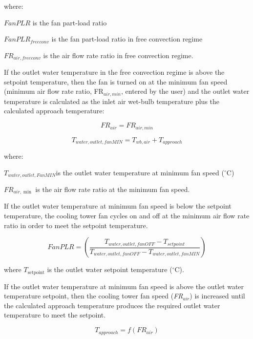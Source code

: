 where:

\(FanPLR\) is the fan part-load ratio

\(FanPL{R_{freeconv}}\) is the fan part-load ratio in free convection regime

\(F{R_{air,freeconv}}\) is the air flow rate ratio in free convection regime.

If the outlet water temperature in the free convection regime is above the setpoint temperature, then the fan is turned on at the minimum fan speed (minimum air flow rate ratio, FR\(_{air,min}\), entered by the user) and the outlet water temperature is calculated as the inlet air wet-bulb temperature plus the calculated approach temperature:

\begin{equation}
FR_{air} = FR_{air,min}
\end{equation}

\begin{equation}
T_{water,outlet,fanMIN} = T_{wb,air} + T_{approach}
\end{equation}

where:

\({T_{water,outlet,FanMIN}}\)is the outlet water temperature at minimum fan speed (\(^{\circ}\)C)

\(F{R_{air,\min }}\) is the air flow rate ratio at the minimum fan speed.

If the outlet water temperature at minimum fan speed is below the setpoint temperature, the cooling tower fan cycles on and off at the minimum air flow rate ratio in order to meet the setpoint temperature.

\begin{equation}
FanPLR = \left( {\frac{{{T_{water,outlet,fanOFF}} - {T_{setpoint}}}}{{{T_{water,outlet,fanOFF}} - {T_{water,outlet,fanMIN}}}}} \right)
\end{equation}

where \({T_{{\mathrm{setpoint}}}}\) is the outlet water setpoint temperature (\(^{\circ}\)C).

If the outlet water temperature at minimum fan speed is above the outlet water temperature setpoint, then the cooling tower fan speed (\emph{FR\(_{air}\)}) is increased until the calculated approach temperature produces the required outlet water temperature to meet the setpoint.

\begin{equation}
{T_{approach}} = f\left( {F{R_{air}}} \right)
\end{equation}

